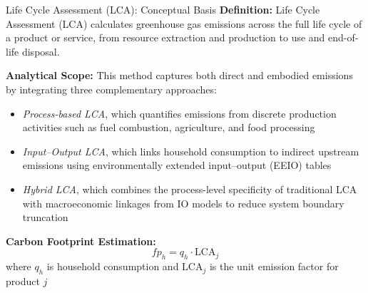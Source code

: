 \documentclass{beamer}
\begin{document}
\begin{frame}{Life Cycle Assessment (LCA): Conceptual Basis}
\footnotesize
\vspace{-0.5em}
\textbf{Definition:}  
Life Cycle Assessment (LCA) calculates greenhouse gas emissions across the full life cycle of a product or service, from resource extraction and production to use and end-of-life disposal.

\vspace{0.7em}
\textbf{Analytical Scope:}  
This method captures both direct and embodied emissions by integrating three complementary approaches:
\begin{itemize}
  \item \textit{Process-based LCA}, which quantifies emissions from discrete production activities such as fuel combustion, agriculture, and food processing
  \item \textit{Input–Output LCA}, which links household consumption to indirect upstream emissions using environmentally extended input–output (EEIO) tables
  \item \textit{Hybrid LCA}, which combines the process-level specificity of traditional LCA with macroeconomic linkages from IO models to reduce system boundary truncation
\end{itemize}

\vspace{0.7em}
\textbf{Carbon Footprint Estimation:}
\[
fp_h = q_h \cdot \text{LCA}_j
\]
where $q_h$ is household consumption and $\text{LCA}_j$ is the unit emission factor for product $j$

\end{frame}
\end{document}
